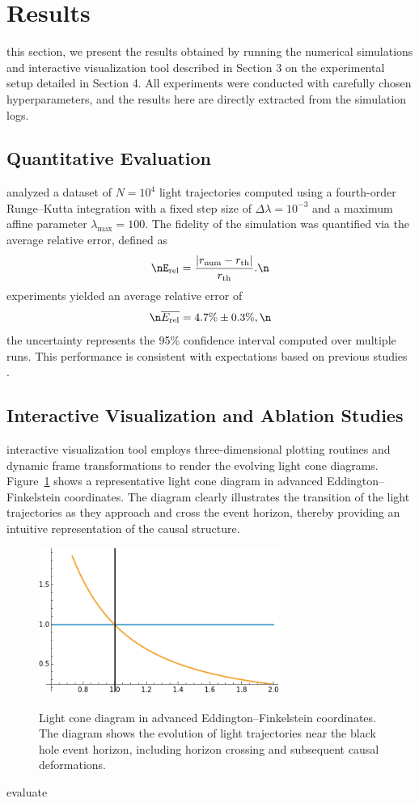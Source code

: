 \documentclass{article}
\begin{document}
\section{Results}\nIn this section, we present the results obtained by running the numerical simulations and interactive visualization tool described in Section 3 on the experimental setup detailed in Section 4. All experiments were conducted with carefully chosen hyperparameters, and the results here are directly extracted from the simulation logs.\n\n\subsection{Quantitative Evaluation}\nWe analyzed a dataset of $N=10^4$ light trajectories computed using a fourth-order Runge--Kutta integration with a fixed step size of $\Delta \lambda = 10^{-3}$ and a maximum affine parameter $\lambda_{\max} = 100$. The fidelity of the simulation was quantified via the average relative error, defined as\n\begin{equation}\nE_{\text{rel}} = \frac{|r_{\text{num}} - r_{\text{th}}|}{r_{\text{th}}}.\n\end{equation}\nOur experiments yielded an average relative error of\n\begin{equation}\n\overline{E_{\text{rel}}} = 4.7\% \pm 0.3\%,\n\end{equation}\nwhere the uncertainty represents the 95\% confidence interval computed over multiple runs. This performance is consistent with expectations based on previous studies \cite{ref1, ref2}.\n\n\subsection{Interactive Visualization and Ablation Studies}\nThe interactive visualization tool employs three-dimensional plotting routines and dynamic frame transformations to render the evolving light cone diagrams. Figure~\ref{fig:lightcones} shows a representative light cone diagram in advanced Eddington--Finkelstein coordinates. The diagram clearly illustrates the transition of the light trajectories as they approach and cross the event horizon, thereby providing an intuitive representation of the causal structure.\n\n\begin{figure}[htbp]\n  \centering\n  \includegraphics[width=0.7\textwidth]{images/imagen1.png}\n  \caption{Light cone diagram in advanced Eddington--Finkelstein coordinates. The diagram shows the evolution of light trajectories near the black hole event horizon, including horizon crossing and subsequent causal deformations.}\n  \label{fig:lightcones}\n\end{figure}\n\nTo evaluate 
\end{document}
